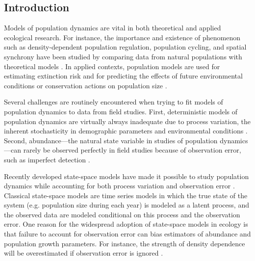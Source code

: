 \documentclass[12pt,english]{article}
\begin{document}
\begin{spacing}{1.9}
\begin{flushleft}

\section*{Introduction}
Models of population dynamics are vital in both theoretical and
applied ecological research. For instance, 
the importance and existence of phenomenon such as
density-dependent population regulation, population cycling, and
spatial synchrony have been studied by comparing data from natural
populations with theoretical models
\citep{may:1975,turchin:1990,bjornstad_etal:1999}. 
In applied contexts, population models are used for estimating extinction risk %
\citep{schoener_spiller:1992,nadeem_lele:2011,hostetler_etal:2012} and for predicting the
effects of future environmental conditions or conservation actions on
population size \citep{jamieson_brooks:2004,hatfield_etal:2012}.

Several challenges are routinely encountered when trying to fit models
of population dynamics to data from field studies. 
First, deterministic models of population dynamics are virtually always inadequate due to process
variation, the inherent stochasticity in demographic parameters and environmental
conditions \citep{bjornstad_grenfell:2001,saether_engen:2002}.
Second, abundance---the natural state variable in studies
of population dynamics---can rarely be observed perfectly in field
studies because of observation error, such as imperfect
detection \citep{link_nichols:1994,kery_etal:2009}.

Recently developed state-space models 
have made it possible to
study population dynamics while accounting for both process variation
and observation error \citep{devalpine_hastings:2002,
  buckland_etal:2004, dennis_etal:2006}. Classical state-space
models are time series models in which the true state of the
system (e.g. population size during each year) is modeled as a latent %
process, and the observed data are modeled conditional on this process
and the observation error. One reason for the widespread adoption of
state-space models in ecology is that failure to account for 
observation error can bias estimators of abundance and
population growth parameters. For instance, the strength of
density dependence will be overestimated if observation error is
ignored \citep{link_nichols:1994,shenk_etal:1998}.


\end{flushleft}
\end{spacing}
\end{document}
